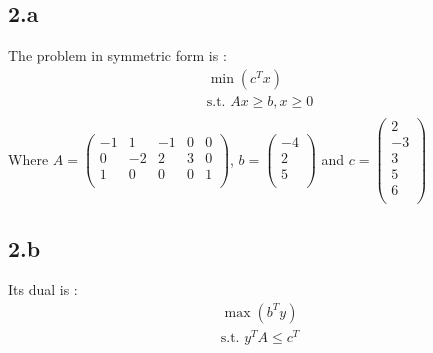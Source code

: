 \documentclass{article}
\begin{document}
\subsection*{2.a}
The problem in symmetric form is :
\begin{equation}
    \begin{array}{c}
        \min(c^Tx)\\
        \text{s.t. } Ax\ge b, x \ge 0\\
    \end{array}
\end{equation}
Where $A = \left(\begin{array}{ccccc}
    -1&1&-1&0&0\\
    0&-2&2&3&0\\
    1&0&0&0&1\\
\end{array}\right)$, $b = \left(\begin{array}{c}
    -4\\
    2\\
    5\\
\end{array}\right)$ and $c =\left(\begin{array}{c}
    2\\
    -3\\
    3\\
    5\\
    6\\
\end{array}\right)$ 
\\
\subsection*{2.b}
Its dual is : \begin{equation}
    \begin{array}{c}
        \max(b^Ty)\\
        \text{s.t. }y^TA\leq c^T\\
    \end{array}
\end{equation}
\end{document}

